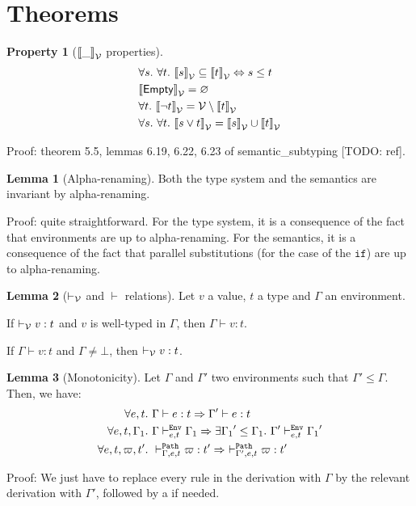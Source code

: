 \documentclass[a4paper]{article}
\theoremstyle{definition}
\newtheorem{lemma}{Lemma}
\newtheorem{property}{Property}
\begin{document}
    \section{Theorems}

        \begin{property}[${\llbracket \_ \rrbracket}_{\mathcal{V}}$ properties]
          \begin{align*}
            &\forall s.\ \forall t.\ {\llbracket s \rrbracket}_{\mathcal{V}} \subseteq {\llbracket t \rrbracket}_{\mathcal{V}} \Leftrightarrow s \leq t\\
            &{\llbracket \textsf{Empty} \rrbracket}_{\mathcal{V}} = \varnothing\\
            &\forall t.\ {\llbracket \neg t \rrbracket}_{\mathcal{V}} = \mathcal{V} \setminus {\llbracket t \rrbracket}_{\mathcal{V}}\\
            &\forall s.\ \forall t.\ {\llbracket s\vee t \rrbracket}_{\mathcal{V}} = {\llbracket s \rrbracket}_{\mathcal{V}} \cup {\llbracket t \rrbracket}_{\mathcal{V}}
          \end{align*}
        \end{property}
        Proof: theorem 5.5, lemmas 6.19, 6.22, 6.23 of semantic_subtyping [TODO: ref].

        \begin{lemma}[Alpha-renaming]
          Both the type system and the semantics are invariant by alpha-renaming.
        \end{lemma}
        Proof: quite straightforward.
        For the type system, it is a consequence of the fact that environments are up to alpha-renaming.
        For the semantics, it is a consequence of the fact that parallel substitutions (for the case of the $\texttt{if}$)
        are up to alpha-renaming.

        \begin{lemma}[$\vdash_{\mathcal{V}}$ and $\vdash$ relations]Let $v$ a value, $t$ a type and $\Gamma$ an environment.

          If $\vdash_{\mathcal{V}} v:t$ and $v$ is well-typed in $\Gamma$, then $\Gamma\vdash v:t$.

          If $\Gamma \vdash v:t$ and $\Gamma\neq\bot$, then $\vdash_{\mathcal{V}} v:t$.
        \end{lemma}
    
        \begin{lemma}[Monotonicity]
          Let $\Gamma$ and $\Gamma'$ two environments such that $\Gamma' \leq \Gamma$.
          Then, we have:
          \begin{align*}
            \forall e,t.\ &\Gamma \vdash e:t \Rightarrow \Gamma' \vdash e:t\\
            \forall e,t,\Gamma_1.\ &\Gamma \vdash^{\texttt{Env}}_{e,t} \Gamma_1 \Rightarrow \exists {\Gamma_1}'\leq \Gamma_1.\ \Gamma' \vdash^{\texttt{Env}}_{e,t} {\Gamma_1}'\\
            \forall e,t,\varpi,t'.\ &\vdash^{\texttt{Path}}_{\Gamma,e,t} \varpi:t' \Rightarrow\ \vdash^{\texttt{Path}}_{\Gamma',e,t} \varpi:t'
          \end{align*}
        \end{lemma}
        Proof: We just have to replace every  rule in the derivation with $\Gamma$
        by the relevant derivation with $\Gamma'$, followed by a  if needed.
\end{document}
